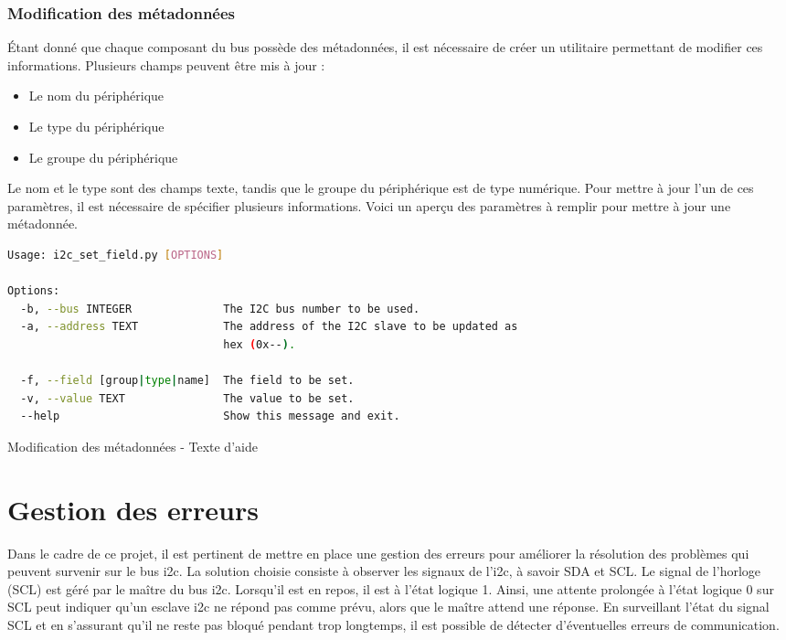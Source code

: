 \subsubsection{Modification des métadonnées}

Étant donné que chaque composant du bus possède des métadonnées, il est nécessaire de créer un utilitaire permettant de modifier ces informations.
Plusieurs champs peuvent être mis à jour :

\begin{itemize}
    \item Le nom du périphérique
    \item Le type du périphérique
    \item Le groupe du périphérique
\end{itemize}

Le nom et le type sont des champs texte, tandis que le groupe du périphérique est de type numérique.
Pour mettre à jour l'un de ces paramètres, il est nécessaire de spécifier plusieurs informations.
Voici un aperçu des paramètres à remplir pour mettre à jour une métadonnée.

\begin{listing}[!h]
    \begin{lstlisting}[language=bash]
Usage: i2c_set_field.py [OPTIONS]

Options:
  -b, --bus INTEGER              The I2C bus number to be used.
  -a, --address TEXT             The address of the I2C slave to be updated as
                                 hex (0x--).

  -f, --field [group|type|name]  The field to be set.
  -v, --value TEXT               The value to be set.
  --help                         Show this message and exit.
    \end{lstlisting}
    \caption{Modification des métadonnées - Texte d'aide}
\end{listing}

\section{Gestion des erreurs}

Dans le cadre de ce projet, il est pertinent de mettre en place une gestion des erreurs pour améliorer la résolution des problèmes qui peuvent survenir sur le bus \gls{i2c}.
La solution choisie consiste à observer les signaux de l'\gls{i2c}, à savoir SDA et SCL.
Le signal de l'horloge (SCL) est géré par le maître du bus \gls{i2c}. Lorsqu'il est en repos, il est à l'état logique 1.
Ainsi, une attente prolongée à l'état logique 0 sur SCL peut indiquer qu'un esclave \gls{i2c} ne répond pas comme prévu, alors que le maître attend une réponse.
En surveillant l'état du signal SCL et en s'assurant qu'il ne reste pas bloqué pendant trop longtemps, il est possible de détecter d'éventuelles erreurs de communication.

